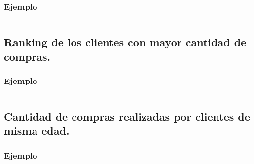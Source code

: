 \subsubsection{Ejemplo}
\begin{lstlisting}
\end{lstlisting}

\subsection{Ranking de los clientes con mayor cantidad de compras.}

\subsubsection{Ejemplo}
\begin{lstlisting}
\end{lstlisting}


\subsection{Cantidad de compras realizadas por clientes de misma edad.}

\subsubsection{Ejemplo}
\begin{lstlisting}
\end{lstlisting}

